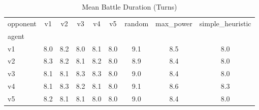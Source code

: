 \begin{table}[htbp]
\caption{Mean Battle Duration (Turns)}
\label{tab:doubles_turns}
\begin{tabular}{lcccccccc}
\hline
opponent & v1 & v2 & v3 & v4 & v5 & random & max_power & simple_heuristic \\
agent &  &  &  &  &  &  &  &  \\
\hline
v1 & 8.0 & 8.2 & 8.0 & 8.1 & 8.0 & 9.1 & 8.5 & 8.0 \\
v2 & 8.3 & 8.2 & 8.1 & 8.2 & 8.0 & 8.9 & 8.4 & 8.0 \\
v3 & 8.1 & 8.1 & 8.3 & 8.3 & 8.0 & 9.0 & 8.4 & 8.0 \\
v4 & 8.1 & 8.3 & 8.2 & 8.1 & 8.0 & 9.1 & 8.6 & 8.3 \\
v5 & 8.2 & 8.1 & 8.1 & 8.0 & 8.0 & 9.0 & 8.4 & 8.0 \\
\hline
\end{tabular}
\end{table}
